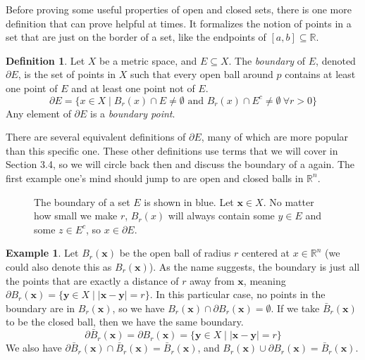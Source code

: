 \documentclass{article}
\newcommand{\R}{\mathbb{R}}
\newcommand{\x}{\mathbf{x}}
\newcommand{\y}{\mathbf{y}}
\theoremstyle{definition}
\newtheorem{definition}{Definition}[section]
\newtheorem{example}{Example}[section]
\begin{document}
	Before proving some useful properties of open and closed sets, there is one more definition that can prove helpful at times. It formalizes the notion of points in a set that are just on the border of a set, like the endpoints of $ [a,b]\subseteq\R $.  
	\begin{definition}\label{def2.12}
		Let $ X $ be a metric space, and $ E\subseteq X $. The \textit{\color{red}boundary} of $ E $, denoted $ \partial E $, is the set of points in $ X $ such that every open ball around $ p $ contains at least one point of $ E $ and at least one point not of $ E $. $$ \partial E=\{x\in X\mid B_r(x)\cap E\neq\emptyset\text{ and }B_r(x)\cap  E^c\neq\emptyset \ \forall r>0  \} $$ 
		Any element of $ \partial E $ is a \textit{\color{red}boundary point}.
	\end{definition}
	There are several equivalent definitions of $ \partial E $, many of which are more popular than this specific one. These other definitions use terms that we will cover in Section 3.4, so we will circle back then and discuss the boundary of a again. The first example one's mind should jump to are open and closed balls in $ \R^n $. 
	\begin{figure}[h]
		\centering
		\caption{The boundary of a set $ E $ is shown in blue. Let $ \x\in X $. No matter how small we make $ r $, $ B_r(x) $ will always contain some $ y\in E $ and some $ z\in E^c $, so $ x\in\partial E $. } 
	\end{figure}
	\begin{example}
		Let $ B_r(\x) $ be the open ball of radius $ r $ centered at $ x\in\R^n $ (we could also denote this as $ B_r(\x) $). As the name suggests, the boundary is just all the points that are exactly a distance of $ r $ away from $ \x $, meaning $ \partial B_r(\x)=\{\y\in X\mid |\x-\y|=r\} $. In this particular case, no points in the boundary are in $ B_r(\x) $, so we have $ B_r(\x)\cap\partial B_r(\x)=\emptyset  $. If we take $ \bar{B}_r(\x) $ to be the closed ball, then we have the same boundary. $$\partial \bar{B}_r(\x)=\partial B_r(\x)=\{\y\in X\mid |\x-\y|=r\} $$ We also have $ \partial \bar{B}_r(\x)\cap \bar{B}_r(\x)=\bar{B}_r(\x)  $, and $ B_r(\x)\cup\partial B_r(\x)=\bar{B}_r(\x) $. 
	\end{example}
\end{document}
